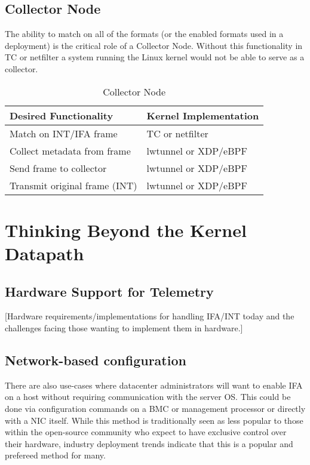 \documentclass[letterpaper,twocolumn,10pt]{article}
\begin{document}
\subsection{Collector Node}
The ability to match on all of the formats (or the enabled formats used
in a deployment) is the critical role of a Collector Node.  Without this
functionality in TC or netfilter a system running the Linux kernel would
not be able to serve as a collector.
\begin{table}[h!]
  \begin{center}
    \caption{Collector Node}
    \label{tab:table3}
    \begin{tabular}{l|l}
      \textbf{Desired Functionality} & \textbf{Kernel Implementation} \\
      \hline
      Match on INT/IFA frame & TC or netfilter \\
      \hline
      Collect metadata from frame & lwtunnel or XDP/eBPF \\
      \hline
      Send frame to collector & lwtunnel or XDP/eBPF \\
      \hline
      Transmit original frame (INT) & lwtunnel or XDP/eBPF \\
    \end{tabular}
  \end{center}
\end{table}

\section{Thinking Beyond the Kernel Datapath}

\subsection{Hardware Support for Telemetry}

[Hardware requirements/implementations for handling IFA/INT today and the
challenges facing those wanting to implement them in hardware.]

\subsection{Network-based configuration}

There are also use-cases where datacenter administrators will want to
enable IFA on a host without requiring communication with the server OS.
This could be done via configuration commands on a BMC or management
processor or directly with a NIC itself.  While this method is
traditionally seen as less popular to those within the open-source
community who expect to have exclusive control over their hardware,
industry deployment trends indicate that this is a popular and prefereed
method for many.
\end{document}
